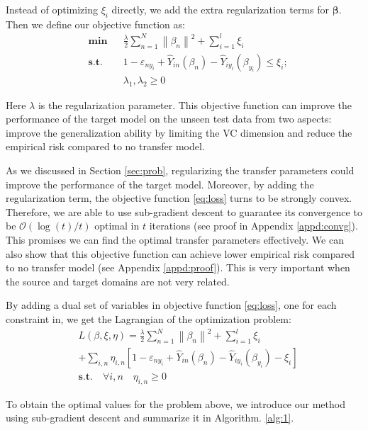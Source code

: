 Instead of optimizing $\xi_i$ directly, we add the extra regularization terms for $\boldsymbol{\beta}$. Then we define our objective function as:
\begin{equation}\label{eq:loss}
\begin{aligned}
& \textbf{min}
& & \frac{{{\lambda}}}{2}\sum\limits_{n = 1}^N {{{\left\| {{\beta _{n}}} \right\|}^2}}  + \sum\limits_{i = 1}^l {{\xi _i}}   \\
& \textbf{s.t.}
& & 1 - {\varepsilon _{n{y_i}}} + {\hat Y_{in}}\left( {\beta_n } \right) - {\hat Y_{i{y_i}}}\left( {\beta_{y_i} } \right) \le {\xi_i};\\
& & &\lambda_1,\lambda_2 \ge 0
\end{aligned}
\end{equation}

Here $\lambda$ is the regularization parameter. This objective function can improve the performance of the target model on the unseen test data from two aspects: improve the generalization ability by limiting the VC dimension and reduce the empirical risk compared to no transfer model.

As we discussed in Section \ref{sec:prob}, regularizing the transfer parameters could improve the performance of the target model. Moreover, by adding the regularization term, the objective function \eqref{eq:loss} turns to be strongly convex. Therefore, we are able to use sub-gradient descent \cite{boyd2004convex} to guarantee its convergence to be $\mathcal{O}(\log(t)/t)$ optimal in $t$ iterations  (see proof in Appendix \ref{appd:convg}). This promises we can find the optimal transfer parameters effectively.
We can also show that this objective function can achieve lower empirical risk compared to no transfer model (see Appendix \ref{appd:proof}). This is very important when the source and target domains are not very related.

 
By adding a dual set of variables in objective function \eqref{eq:loss}, one for each constraint in, we get the Lagrangian of the optimization problem:
\begin{equation}\label{eq:dual}
\begin{aligned}
 &L\left( {\beta ,\xi ,\eta } \right) =
 \frac{{{\lambda}}}{2}\sum\limits_{n = 1}^N {{{\left\| {{\beta _n}} \right\|}^2}}  + \sum\limits_{i = 1}^l {{\xi _i}} \\
   &+ \sum\limits_{i,n} {{\eta _{i,n}}\left[ {1 - {\varepsilon _{n{y_i}}} + {{\hat Y}_{in}}\left( {\beta_n } \right) - {{\hat Y}_{i{y_i}}}\left( {\beta_{y_i} } \right) - {\xi _i}} \right]}  \\
 &\textbf{s.t.} \quad  \forall i,n \quad {} {\eta _{i,n}} \ge 0
\end{aligned}
\end{equation}

To obtain the optimal values for the problem above, we introduce our method using sub-gradient descent \cite{BoydCO} and summarize it in Algorithm. \ref{alg:1}. 

